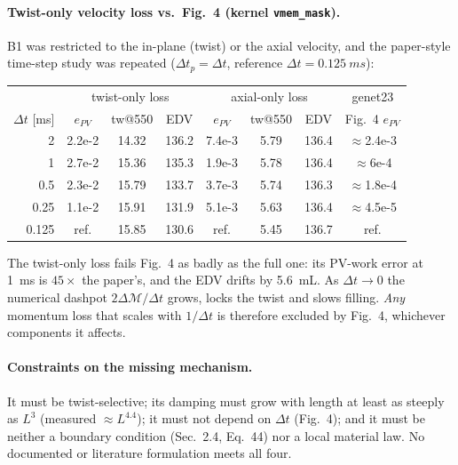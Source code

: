 \documentclass[10pt]{article}
\begin{document}
\paragraph{Twist-only velocity loss vs.\ Fig.~4 (kernel \texttt{vmem\_mask}).} B1 was restricted
to the in-plane (twist) or the axial velocity, and the paper-style time-step study was repeated
($\Delta t_p=\Delta t$, reference $\Delta t=\SI{0.125}{ms}$):
\begin{center}\small\begin{tabular}{r|ccc|ccc|c}
\toprule
 & \multicolumn{3}{c|}{twist-only loss} & \multicolumn{3}{c|}{axial-only loss} & genet23 \\
$\Delta t$ [ms] & $e_{PV}$ & tw@550 & EDV & $e_{PV}$ & tw@550 & EDV & Fig.~4 $e_{PV}$ \\ \midrule
2    & 2.2e-2 & 14.32 & 136.2 & 7.4e-3 & 5.79 & 136.4 & $\approx$2.4e-3 \\
1    & 2.7e-2 & 15.36 & 135.3 & 1.9e-3 & 5.78 & 136.4 & $\approx$6e-4 \\
0.5  & 2.3e-2 & 15.79 & 133.7 & 3.7e-3 & 5.74 & 136.3 & $\approx$1.8e-4 \\
0.25 & 1.1e-2 & 15.91 & 131.9 & 5.1e-3 & 5.63 & 136.4 & $\approx$4.5e-5 \\
0.125 & ref. & 15.85 & 130.6 & ref. & 5.45 & 136.7 & ref. \\ \bottomrule
\end{tabular}\end{center}
The twist-only loss fails Fig.~4 as badly as the full one: its PV-work error at \SI{1}{ms} is
$45\times$ the paper's, and the EDV drifts by \SI{5.6}{mL}. As $\Delta t\to0$ the numerical dashpot
$2\Delta\mathcal M/\Delta t$ grows, locks the twist and slows filling. \emph{Any} momentum loss
that scales with $1/\Delta t$ is therefore excluded by Fig.~4, whichever components it affects.

\paragraph{Constraints on the missing mechanism.} It must be twist-selective; its damping must
grow with length at least as steeply as $L^3$ (measured $\approx L^{4.4}$); it must not depend on
$\Delta t$ (Fig.~4); and it must be neither a boundary condition (Sec.~2.4, Eq.~44) nor a local
material law. No documented or literature formulation meets all four.

\clearpage
\end{document}
